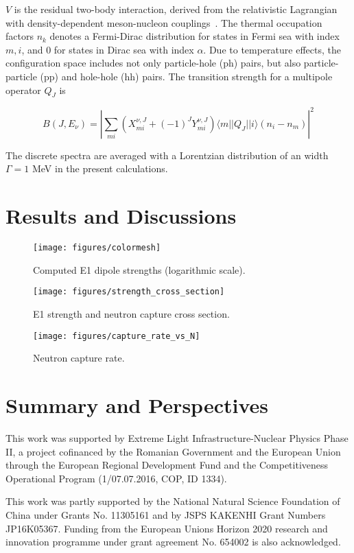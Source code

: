 \documentclass[prc,twocolumn,twoside,showpacs,superscriptaddress,floatfix]{revtex4-1}
\begin{document}
$V$ is the residual two-body interaction, derived from the relativistic
Lagrangian with  density-dependent meson-nucleon couplings~\cite{Niksic}.
The
thermal occupation factors $n_k$ denotes a Fermi-Dirac distribution for states
in Fermi sea with index $m,i$, and $0$ for states in Dirac sea with index
$\alpha$.
Due to temperature effects, the configuration space includes not only
particle-hole (ph) pairs, but also particle-particle (pp) and hole-hole (hh)
pairs.
The transition strength for a multipole operator $Q_J$ is

\begin{equation}
   B(J,E_\nu) = \left | \sum_{mi} (X^{\nu,J}_{mi} +
   (-1)^J Y^{\nu,J}_{mi} ) \langle m || Q_J || i\rangle (n_i
   -n_m) \right |^2
\end{equation}

The discrete spectra are averaged with a Lorentzian distribution of an width
$\Gamma = 1 $ MeV in the present calculations.




\section{Results and Discussions}\label{sec:results}

\begin{figure}[htp]
\centering
\texttt{[image: figures/colormesh]}
\caption{\label{fig:e1}Computed E1 dipole strengths (logarithmic scale).}
\end{figure}

\begin{figure}[htp]
\centering
\texttt{[image: figures/strength\_cross\_section]}
\caption{\label{fig:e1_xsec}E1 strength and neutron capture cross section.}
\end{figure}

\begin{figure}[htp]
\centering
\texttt{[image: figures/capture\_rate\_vs\_N]}
\caption{\label{fig:neutron_capture}Neutron capture rate.}
\end{figure}

\section{Summary and Perspectives}\label{sec:summary}

{}

This work was supported by Extreme Light Infrastructure-Nuclear
Physics Phase II, a project cofinanced by the Romanian Government
and the European Union through the European Regional Development
Fund and the Competitiveness Operational Program (1/07.07.2016,
COP, ID 1334).

This work was partly supported by the National Natural Science Foundation of China
under Grants No. 11305161 and by JSPS KAKENHI Grant Numbers JP16K05367.
Funding from the European Unions Horizon 2020 research and innovation
programme under grant agreement No. 654002 is also
acknowledged.

\clearpage

\end{document}
